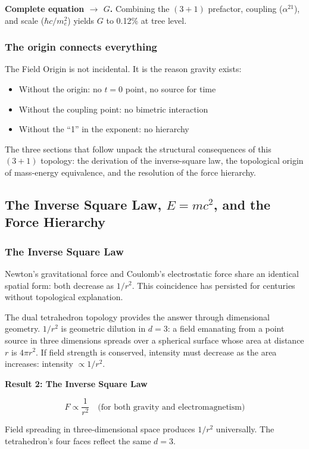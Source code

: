 \documentclass[aps,prd,preprint,superscriptaddress,showpacs,preprintnumbers,amsmath,amssymb,nofootinbib]{revtex4-2}
\begin{document}
\textbf{Complete equation $\rightarrow$ $G$.} Combining the $(3+1)$ prefactor, coupling ($\alpha^{21}$), and scale ($\hbar c/m_e^2$) yields $G$ to 0.12\% at tree level.

\subsubsection*{The origin connects everything}

The Field Origin is not incidental. It is the reason gravity exists:
\begin{itemize}
\item Without the origin: no $t = 0$ point, no source for time
\item Without the coupling point: no bimetric interaction
\item Without the ``1'' in the exponent: no hierarchy
\end{itemize}

The three sections that follow unpack the structural consequences of this $(3{+}1)$ topology: the derivation of the inverse-square law, the topological origin of mass-energy equivalence, and the resolution of the force hierarchy.

\subsection{The Inverse Square Law, $E = mc^2$, and the Force Hierarchy}
\label{subsec:inverse-hierarchy}

\subsubsection*{The Inverse Square Law}

Newton's gravitational force and Coulomb's electrostatic force share an identical spatial form: both decrease as $1/r^2$. This coincidence has persisted for centuries without topological explanation.

The dual tetrahedron topology provides the answer through dimensional geometry. $1/r^2$ is geometric dilution in $d = 3$: a field emanating from a point source in three dimensions spreads over a spherical surface whose area at distance $r$ is $4\pi r^2$. If field strength is conserved, intensity must decrease as the area increases: intensity $\propto 1/r^2$.

\vspace{1.5em}
\noindent
\colorbox{resultgreen}{\parbox{\dimexpr\textwidth-2\fboxsep\relax}{%
\vspace{0.8em}
\centering
\textbf{\large Result 2: The Inverse Square Law}

\vspace{0.5em}
\boldmath
\begin{equation}
F \propto \frac{1}{r^2} \quad \text{(for both gravity and electromagnetism)}
\end{equation}
\unboldmath

\vspace{0.3em}
Field spreading in three-dimensional space produces $1/r^2$ universally. The tetrahedron's four faces reflect the same $d = 3$.
\vspace{0.5em}
}}
\vspace{1cm}
\end{document}
